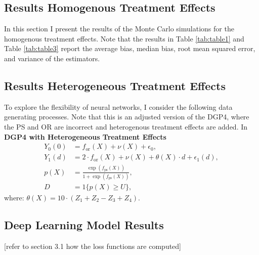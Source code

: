\subsection{Results Homogenous Treatment Effects}



In this section I present the results of the Monte Carlo simulations for the homogenous treatment effects.
Note that the results in Table \ref{tab:table1}  and Table \ref{tab:table3} report the average bias, median bias, root mean squared error, and variance of the estimators.





\subsection{Results Heterogeneous Treatment Effects}
To explore the flexibility of neural networks, I consider the following data generating processes. Note that this is an adjusted version of the DGP4, where the PS and OR are incorrect and heterogenous treatment effects are added. In \\
\textbf{DGP4 with Heterogeneous Treatment Effects}
\begin{align*}
    Y_0(0) &= f_{\text{or}}(X) + \nu(X) + \epsilon_0, \\
    Y_1(d) &= 2 \cdot f_{\text{or}}(X) + \nu(X) + \theta(X) \cdot d + \epsilon_1(d), \\
    p(X) &= \frac{\exp \left( f_{\text{ps}}(X) \right)}{1 + \exp \left( f_{\text{ps}}(X) \right)}, \\
    D &= 1\{ p(X) \geq U \},
\end{align*}
where: $\theta(X) = 10 \cdot (Z_1 + Z_2 - Z_3 + Z_4)$.



\subsection{Deep Learning Model Results}
[refer to section 3.1 how the loss functions are computed]


